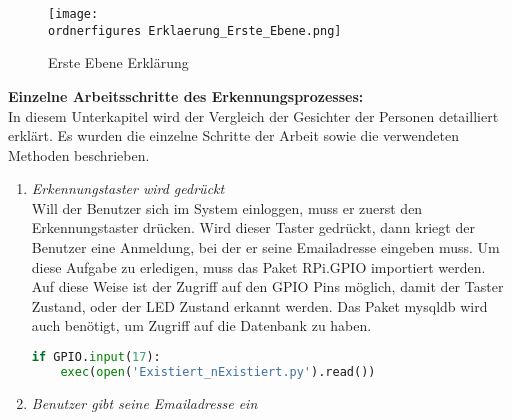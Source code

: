 \begin{figure}[H]
	\texttt{[image: \\ordnerfigures Erklaerung\_Erste\_Ebene.png]}
	\caption{Erste Ebene Erklärung}
	\label{fig:Erklaerung_Erste_Ebene}
\end{figure}

\textbf{Einzelne Arbeitsschritte des Erkennungsprozesses: }\\

In diesem Unterkapitel wird der Vergleich der Gesichter der Personen detailliert erklärt. Es wurden die einzelne Schritte der Arbeit sowie die verwendeten Methoden beschrieben.

\begin{enumerate}
	
	\item \textit{Erkennungstaster wird gedr{\"u}ckt} \\
	
	Will der Benutzer sich im System einloggen, muss er zuerst den Erkennungstaster dr{\"u}cken. Wird dieser Taster gedr{\"u}ckt, dann kriegt der Benutzer eine Anmeldung, bei der er seine Emailadresse eingeben muss. Um diese Aufgabe zu erledigen, muss das Paket RPi.GPIO importiert werden. Auf diese Weise ist der Zugriff auf den GPIO Pins m{\"o}glich, damit der Taster Zustand, oder der LED Zustand erkannt werden. Das Paket mysqldb wird auch ben{\"o}tigt, um Zugriff auf die Datenbank zu haben.
	\begin{lstlisting}[language=Python]
	if GPIO.input(17):
	exec(open('Existiert_nExistiert.py').read()) 
	\end{lstlisting} 
	\item \textit{Benutzer gibt seine Emailadresse ein} \\
	

\end{enumerate}
